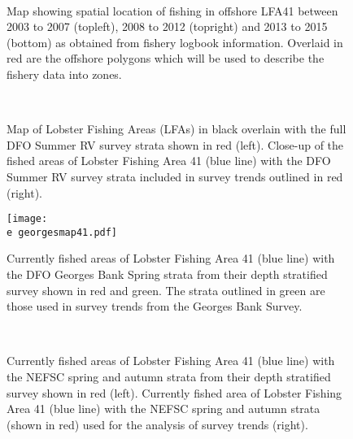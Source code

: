\documentclass[11pt]{article}
\newcommand{\D}{.}
\newcommand{\e}{/backup/bio_data/bio.lobster/figures/}
\begin{document}
\begin{landscape}
\begin{figure}
\centering
{}
\\
\caption{Map showing spatial location of fishing in offshore LFA41 between 2003 to 2007 (topleft), 2008 to 2012 (topright) and 2013 to 2015 (bottom) as obtained from fishery logbook information. Overlaid in red are the offshore polygons which will be used to describe the fishery data into zones. }
\end{figure}
\clearpage

\begin{figure}
\centering
{}
\\
\caption{ Map of Lobster Fishing Areas (LFAs) in black overlain with the full DFO Summer RV survey strata shown in red (left). Close-up of the fished areas of Lobster Fishing Area 41 (blue line) with the DFO Summer RV survey strata included in survey trends outlined in red (right).}
\end{figure}

\end{landscape}
\begin{figure}

    \texttt{[image: \\e georgesmap41.pdf]}
    \caption{Currently fished areas of Lobster Fishing Area 41 (blue line) with the DFO Georges Bank Spring strata from their depth stratified survey shown in red and green. The strata outlined in green are those used in survey trends from the Georges Bank Survey.}

\end{figure}

\begin{landscape}
\begin{figure}
\centering
{}
\\
\caption{ Currently fished areas of Lobster Fishing Area 41 (blue line) with the NEFSC spring and autumn strata from their depth stratified survey shown in red (left). Currently fished area of Lobster Fishing Area 41 (blue line) with the NEFSC spring and autumn strata (shown in red) used for the analysis of survey trends (right).}
\end{figure}


\end{landscape}
\end{document}
